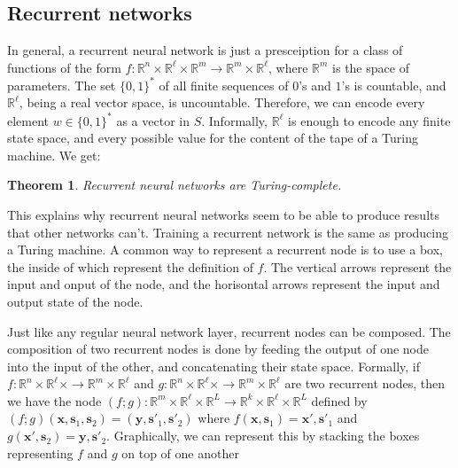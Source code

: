\documentclass[10pt]{amsart}
\newcommand{\R}{\mathbb{R}}
\newcommand{\x}{\mathbf{x}}
\newcommand{\y}{\mathbf{y}}
\newcommand{\s}{\mathbf{s}}
\newtheorem{theorem}{Theorem}[section]
\theoremstyle{definition}
\begin{document}
\subsection{Recurrent networks}

In general, a recurrent neural network is just a presceiption for a class of functions of the form $f:\R^n\times \R^\ell\times\R^m\to \R^m\times \R^\ell$, where $\R^m$ is the space of parameters. The set $\{0,1\}^*$ of all finite sequences of $0$'s and $1$'s is countable, and $\R^\ell$, being a real vector space,
is uncountable.  Therefore, we can encode every element $w\in\{0,1\}^*$ as a vector in $S$.  Informally,
$\R^\ell$ is enough to encode any finite state space, and every possible value for the content of the tape of a
Turing machine. We get:

\begin{theorem}
Recurrent neural networks are Turing-complete.
\end{theorem}

This explains why recurrent neural networks seem to be able to produce results that other networks can't. Training a recurrent network is the same as producing a Turing machine.  A common way to represent a recurrent node is to use a box, the inside of which represent the definition of $f$.  The vertical arrows represent the input and onput of the node, and the horisontal arrows represent the input and output state of the node.

\begin{center}
\end{center}

Just like any regular neural network layer, recurrent nodes can be composed.  The composition of two recurrent nodes is done by feeding the output of one node into the input of the other, and concatenating their state space.  Formally, if $f:\R^n\times \R^\ell\times\to \R^m\times \R^\ell$ and $g:\R^n\times \R^\ell\times\to \R^m\times \R^\ell$ are two recurrent nodes, then we have the node $(f;g):\R^m\times\R^\ell\times\R^L\to\R^k\times\R^\ell\times\R^L$ defined by $(f;g)(\x, \s_1, \s_2) = (\y, \s'_1, \s'_2)$ where $f(\x, \s_1) = \x', \s'_1$ and $g(\x', \s_2) = \y, \s'_2$. Graphically, we can represent this by stacking the boxes representing $f$ and $g$ on top of one another
\end{document}

